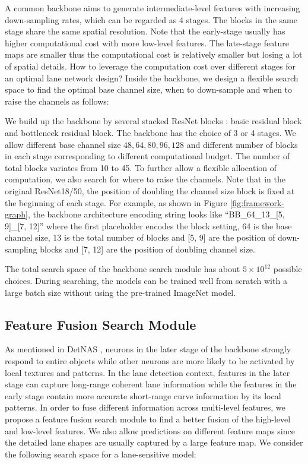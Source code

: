 \documentclass[runningheads]{llncs}
\begin{document}
A common backbone aims to generate intermediate-level features with
increasing down-sampling rates, which can be regarded as 4 stages.
The blocks in the same stage share the same spatial resolution. Note
that the early-stage usually has higher computational cost with more
low-level features. The late-stage feature maps are smaller thus the
computational cost is relatively smaller but losing a lot of spatial
details. How to leverage the computation cost over different stages
for an optimal lane network design? Inside the backbone, we design
a flexible search space to find the optimal base channel size, when
to down-sample and when to raise the channels as follows:

We build up the backbone by several stacked ResNet blocks \cite{he2016deep}:
basic residual block and bottleneck residual block. The backbone has
the choice of 3 or 4 stages. We allow different base channel size
${48,64,80,96,128}$ and different number of blocks in each stage
corresponding to different computational budget. The number of total
blocks variates from 10 to 45. To further allow a flexible allocation
of computation, we also search for where to raise the channels. Note
that in the original ResNet18/50, the position of doubling the channel
size block is fixed at the beginning of each stage. For example, as
shown in Figure \ref{fig:framework-graph}, the backbone architecture
encoding string looks like ``BB\_64\_13\_{[}5, 9{]}\_{[}7, 12{]}''
where the first placeholder encodes the block setting, 64 is the base
channel size, 13 is the total number of blocks and {[}5, 9{]} are
the position of down-sampling blocks and {[}7, 12{]} are the position
of doubling channel size. 

The total search space of the backbone search module has about $5\times10^{12}$
possible choices. During searching, the models can be trained well
from scratch with a large batch size without using the pre-trained
ImageNet model. 

\subsection{Feature Fusion Search Module}

As mentioned in DetNAS \cite{chen2019detnas}, neurons in the later
stage of the backbone strongly respond to entire objects while other
neurons are more likely to be activated by local textures and patterns.
In the lane detection context, features in the later stage can capture
long-range coherent lane information while the features in the early
stage contain more accurate short-range curve information by its local
patterns. In order to fuse different information across multi-level
features, we propose a feature fusion search module to find a better
fusion of the high-level and low-level features. We also allow predictions
on different feature maps since the
detailed lane shapes are usually captured by a large feature map.
We consider the following search space for a lane-sensitive model:
\end{document}

